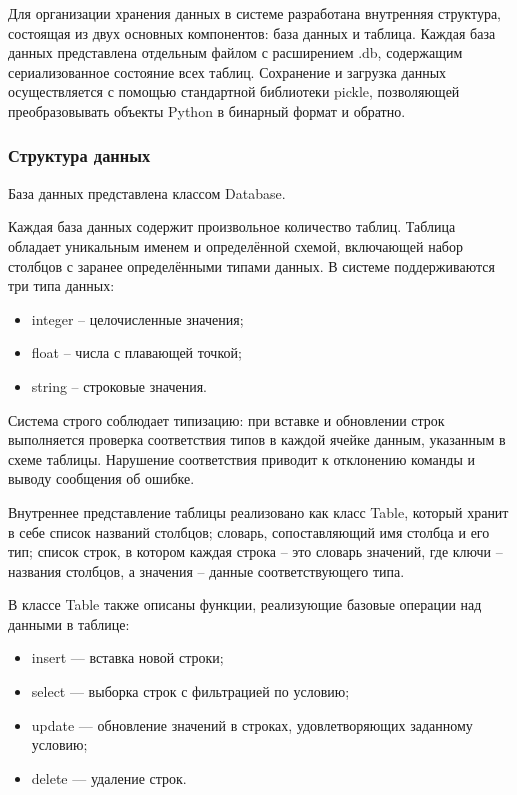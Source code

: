 Для организации хранения данных в системе разработана внутренняя структура, состоящая из двух основных компонентов: база данных и таблица. Каждая база данных представлена отдельным файлом с расширением .db, содержащим сериализованное состояние всех таблиц. Сохранение и загрузка данных осуществляется с помощью стандартной библиотеки pickle, позволяющей преобразовывать объекты Python в бинарный формат и обратно.

\subsubsection{Структура данных}

База данных представлена классом Database.

Каждая база данных содержит произвольное количество таблиц. Таблица обладает уникальным именем и определённой схемой, включающей набор столбцов с заранее определёнными типами данных. В системе поддерживаются три типа данных:
\begin{itemize}
	\item integer -- целочисленные значения;
	\item float -- числа с плавающей точкой;
	\item string -- строковые значения.
\end{itemize}

Система строго соблюдает типизацию: при вставке и обновлении строк выполняется проверка соответствия типов в каждой ячейке данным, указанным в схеме таблицы. Нарушение соответствия приводит к отклонению команды и выводу сообщения об ошибке.

Внутреннее представление таблицы реализовано как класс Table, который хранит в себе список названий столбцов;	словарь, сопоставляющий имя столбца и его тип; список строк, в котором каждая строка -- это словарь значений, где ключи -- названия столбцов, а значения -- данные соответствующего типа.

В классе Table также описаны функции, реализующие базовые операции над данными в таблице:
\begin{itemize}
	\item insert — вставка новой строки;	
	\item select — выборка строк с фильтрацией по условию;	
	\item update — обновление значений в строках, удовлетворяющих заданному условию;	
	\item delete — удаление строк.
\end{itemize}


